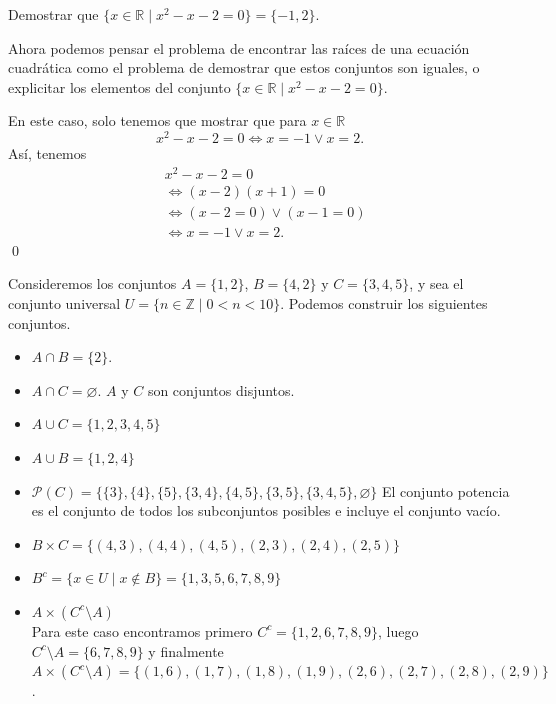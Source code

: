 \documentclass[12pt]{book}
\begin{document}
\begin{exampleenv}
    Demostrar que $\{x\in \mathbb{R}\mid x^2-x-2=0\}=\{-1,2\}$.

    Ahora podemos pensar el problema de encontrar las raíces de una ecuación cuadrática como el problema de demostrar que estos conjuntos son iguales, o explicitar los elementos del conjunto $\{x\in \mathbb{R}\mid x^2-x-2=0\}$.

    En este caso, solo tenemos que mostrar que para $x\in \mathbb{R}$
    \[
    x^2-x-2=0\iff x=-1\vee x=2.
    \]
    Así, tenemos
    \begin{align*}
        &x^2-x-2=0\\
        &\iff(x-2)(x+1)=0\\
        &\iff (x-2=0)\vee(x-1=0)\\
        &\iff x=-1\vee x=2.
    \end{align*}\qed
\end{exampleenv}

\begin{exampleenv}
    Consideremos los conjuntos $A=\{1,2\}$, $B=\{4,2\}$ y $C=\{3,4,5\}$, y sea el conjunto universal $U=\{n\in\mathbb{Z}\mid 0<n<10\}$. Podemos construir los siguientes conjuntos.
    \begin{itemize}
        \item $A\cap B=\{2\}.$
        \item $A\cap C=\varnothing.$ $A$ y $C$ son conjuntos disjuntos.
        \item $A\cup C=\{1,2,3,4,5\}$
        \item $A\cup B=\{1,2,4\}$
        \item $\mathcal{P}(C)=\{\{3\},\{4\},\{5\},\{3,4\},\{4,5\},\{3,5\},\{3,4,5\},\varnothing\}$ El conjunto potencia es el conjunto de todos los subconjuntos posibles e incluye el conjunto vacío.
        \item $B\times C=\{(4,3),(4,4),(4,5),(2,3),(2,4),(2,5)\}$
        \item $B^c=\{x\in U\mid x\notin B\}=\{1,3,5,6,7,8,9\}$
        \item $A\times (C^c\setminus A)$\\
        Para este caso encontramos primero $C^c=\{1,2,6,7,8,9\}$, luego $C^c\setminus A=\{6,7,8,9\}$ y finalmente\\
        $A\times (C^c\setminus A)=\{(1,6),(1,7),(1,8),(1,9),(2,6),(2,7),(2,8),(2,9)\}$.\\
    \end{itemize}
\end{exampleenv}
\end{document}
